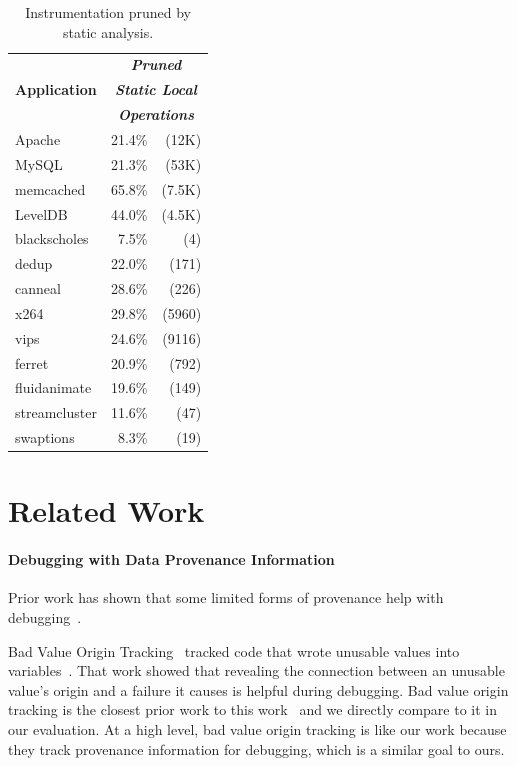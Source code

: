 \documentclass[preprint,10pt]{sigplanconf}
\begin{document}
\begin{table}[htb]
\centering
\small
\begin{tabular}{l | r r }
\multirow{3}{*}{\bf Application} & \multicolumn{2}{c}{\bf \em Pruned } \\
               & \multicolumn{2}{c}{\bf \em Static Local}  \\ 
               & \multicolumn{2}{c}{\bf \em Operations}    \\ \hline


Apache         &  21.4\%&(12K)                    \\
MySQL          &  21.3\%&(53K)                    \\
memcached      &  65.8\%&(7.5K)                   \\
LevelDB        &  44.0\%&(4.5K)                   \\ \hline
blackscholes   &   7.5\%&(4)                      \\
dedup          &   22.0\%&(171)                   \\
canneal        &   28.6\%&(226)                   \\
x264           &   29.8\%&(5960)                  \\
vips           &   24.6\%&(9116)                  \\
ferret         &   20.9\%&(792)                   \\
fluidanimate   &   19.6\%&(149)                   \\
streamcluster  &   11.6\%&(47)                    \\
swaptions      &   8.3\% &(19)                    \\
\end{tabular}
\caption{\label{tab:char}Instrumentation pruned by static analysis.}
\end{table}


\section{Related Work}


\paragraph{Debugging with Data Provenance Information}
Prior work has shown that some limited forms of provenance help
with debugging~\cite{badapples, whylineicse, tipslicingsurvey}. 



Bad Value Origin Tracking~\cite{badapples} tracked code that wrote unusable
values into variables~\cite{badapples}. That work showed that revealing the
connection between an unusable value's origin and a failure it causes is
helpful during debugging.  Bad value origin tracking is the closest prior work
to this work~\cite{badapples} and we directly compare to it in our evaluation.
At a high level, bad value origin tracking is like our work because they track
provenance information for debugging, which is a similar goal to ours.  
\end{document}
